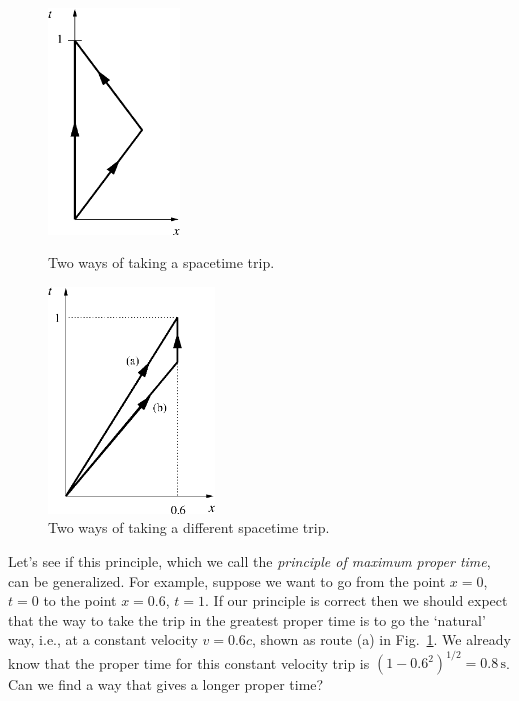 \begin{figure}[h]  
\begin{minipage}[t]{5.0cm}
\begin{center}
\includegraphics[height=6cm]{gravity_and_geometry/trip.eps}
\caption{Two ways of taking a spacetime trip.}
\label{fig:trip}
\end{center}   
\end{minipage}
\hfill
\begin{minipage}[t]{6.3cm}
\begin{center}
\includegraphics[height=6cm]{gravity_and_geometry/trip2.eps}
\caption{Two ways of taking a different spacetime trip.}
\label{fig:trip2}
\end{center}
\end{minipage}
\end{figure}

Let's see if this principle, which we call the {\em principle of
maximum proper time}, can be generalized.  For example, suppose we
want to go from the point $x = 0$, $t = 0$ to the point $x = 0.6$, $t
= 1$.  If our principle is correct then we should expect that the way
to take the trip in the greatest proper time is to go the `natural'
way, i.e., at a constant velocity $v = 0.6 c$, shown as route (a) in
Fig.~\ref{fig:trip2}.  We already know that the proper time for this
constant velocity trip is $(1 -0.6^2)^{1/2} = 0.8\, \mbox{s}$.  Can we
find a way that gives a longer proper time?
        
